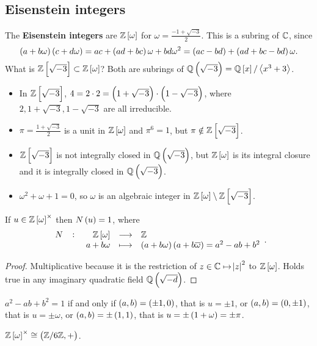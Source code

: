 \pagebreak

\subsection{Eisenstein integers}

The \textbf{Eisenstein integers} are $ \Z\sbr{\omega} $ for $ \omega = \tfrac{-1 + \sqrt{-3}}{2} $. This is a subring of $ \mathbb{C} $, since
$$ \br{a + b\omega}\br{c + d\omega} = ac + \br{ad + bc}\omega + bd\omega^2 = \br{ac - bd} + \br{ad + bc - bd}\omega. $$
What is $ \Z\sbr{\sqrt{-3}} \subset \Z\sbr{\omega} $? Both are subrings of $ \Q\br{\sqrt{-3}} = \Q\sbr{x} / \abr{x^3 + 3} $.
\begin{itemize}
\item In $ \Z\sbr{\sqrt{-3}} $, $ 4 = 2 \cdot 2 = \br{1 + \sqrt{-3}} \cdot \br{1 - \sqrt{-3}} $, where $ 2, 1 + \sqrt{-3}, 1 - \sqrt{-3} $ are all irreducible.
\item $ \pi = \tfrac{1 + \sqrt{-3}}{2} $ is a unit in $ \Z\sbr{\omega} $ and $ \pi^6 = 1 $, but $ \pi \notin \Z\sbr{\sqrt{-3}} $.
\item $ \Z\sbr{\sqrt{-3}} $ is not integrally closed in $ \Q\br{\sqrt{-3}} $, but $ \Z\sbr{\omega} $ is its integral closure and it is integrally closed in $ \Q\br{\sqrt{-3}} $.
\item $ \omega^2 + \omega + 1 = 0 $, so $ \omega $ is an algebraic integer in $ \Z\sbr{\omega} \setminus \Z\sbr{\sqrt{-3}} $.
\end{itemize}

\begin{proposition}
If $ u \in \Z\sbr{\omega}^\times $ then $ N\br{u} = 1 $, where
$$ \function[N]{\Z\sbr{\omega}}{\Z}{a + b\omega}{\br{a + b\omega}\br{a + b\overline{\omega}} = a^2 - ab + b^2}. $$
\end{proposition}

\begin{proof}
Multiplicative because it is the restriction of $ z \in \mathbb{C} \mapsto \abs{z}^2 $ to $ \Z\sbr{\omega} $. Holds true in any imaginary quadratic field $ \Q\br{\sqrt{-d}} $.
\end{proof}

$ a^2 - ab + b^2 = 1 $ if and only if $ \br{a, b} = \br{\pm 1, 0} $, that is $ u = \pm 1 $, or $ \br{a, b} = \br{0, \pm 1} $, that is $ u = \pm\omega $, or $ \br{a, b} = \pm\br{1, 1} $, that is $ u = \pm\br{1 + \omega} = \pm\pi $.

\begin{remark*}
$ \Z\sbr{\omega}^\times \cong \br{\Z / 6\Z, +} $.
\end{remark*}

